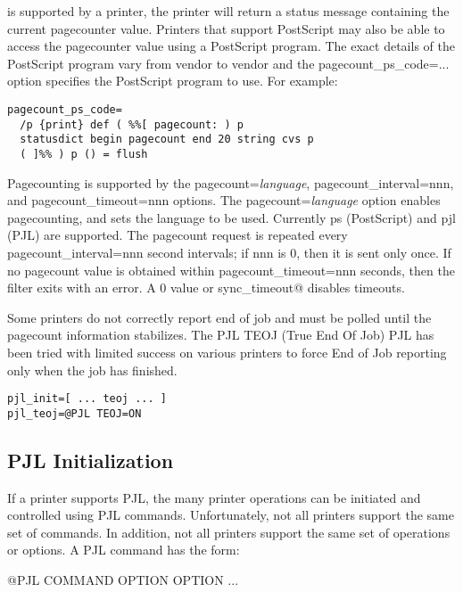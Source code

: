 \documentclass[a4paper]{article}
\begin{document}
is supported by a printer,
the printer will return a status message containing the current pagecounter
value.
Printers that support PostScript may also be able to access the pagecounter
value using a PostScript program.
The exact details of the PostScript program vary from vendor to vendor and
the
{\ttfamily pagecount\_ps\_code=...}
option specifies the PostScript program to use.
For example:
\begin{tscreen}
\begin{verbatim}
pagecount_ps_code=
  /p {print} def ( %%[ pagecount: ) p
  statusdict begin pagecount end 20 string cvs p
  ( ]%% ) p () = flush
\end{verbatim}
\end{tscreen}


Pagecounting is supported by the
{\ttfamily pagecount=}{\itshape language\/},
{\ttfamily pagecount\_interval=nnn},
and
{\ttfamily pagecount\_timeout=nnn}
options.
The
{\ttfamily pagecount=}{\itshape language\/}
option enables pagecounting, and sets the language to be used.
Currently
{\ttfamily ps} (PostScript)
and
{\ttfamily pjl} (PJL)
are supported.
The pagecount request is repeated every
{\ttfamily pagecount\_interval=nnn}
second intervals; if nnn is 0, then it is sent only once.
If no pagecount value is obtained within
{\ttfamily pagecount\_timeout=nnn}
seconds, then the filter exits with an error.
A 0 value or
{\ttfamily sync\_timeout@}
disables timeouts.

Some printers do not correctly report end of job and must be polled
until the pagecount information stabilizes.
The PJL TEOJ (True End Of Job) PJL has been tried with limited success
on various printers to force End of Job reporting only when the
job has finished.
\begin{tscreen}
\begin{verbatim}
pjl_init=[ ... teoj ... ]
pjl_teoj=@PJL TEOJ=ON
\end{verbatim}
\end{tscreen}



\subsection{PJL Initialization
\label{pjlinit}
\label{endpage}
\label{startpage}
\label{pjl_only}
\label{pjl_except}
\label{pjl_vars_set}
\label{pjl_vars_except}
\label{pjl_user_opts}
\label{pjl_init}}

If a printer supports PJL,
the many printer operations can be initiated and controlled using
PJL commands.
Unfortunately,
not all printers support the same set of commands.
In addition,
not all printers support the same set of operations or options.
A PJL command has the form:
\begin{tscreen}
@PJL COMMAND OPTION OPTION ...
\end{tscreen}
\end{document}

